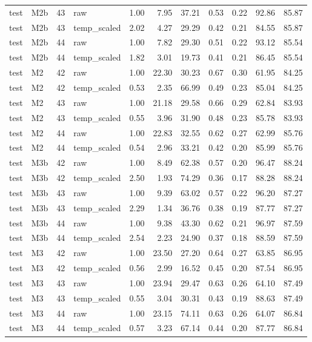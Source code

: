 \begin{tabular}{llrlrrrrrrr}
test & M2b & 43 & raw & 1.00 & 7.95 & 37.21 & 0.53 & 0.22 & 92.86 & 85.87 \\
test & M2b & 43 & temp\_scaled & 2.02 & 4.27 & 29.29 & 0.42 & 0.21 & 84.55 & 85.87 \\
test & M2b & 44 & raw & 1.00 & 7.82 & 29.30 & 0.51 & 0.22 & 93.12 & 85.54 \\
test & M2b & 44 & temp\_scaled & 1.82 & 3.01 & 19.73 & 0.41 & 0.21 & 86.45 & 85.54 \\
test & M2 & 42 & raw & 1.00 & 22.30 & 30.23 & 0.67 & 0.30 & 61.95 & 84.25 \\
test & M2 & 42 & temp\_scaled & 0.53 & 2.35 & 66.99 & 0.49 & 0.23 & 85.04 & 84.25 \\
test & M2 & 43 & raw & 1.00 & 21.18 & 29.58 & 0.66 & 0.29 & 62.84 & 83.93 \\
test & M2 & 43 & temp\_scaled & 0.55 & 3.96 & 31.90 & 0.48 & 0.23 & 85.78 & 83.93 \\
test & M2 & 44 & raw & 1.00 & 22.83 & 32.55 & 0.62 & 0.27 & 62.99 & 85.76 \\
test & M2 & 44 & temp\_scaled & 0.54 & 2.96 & 33.21 & 0.42 & 0.20 & 85.99 & 85.76 \\
test & M3b & 42 & raw & 1.00 & 8.49 & 62.38 & 0.57 & 0.20 & 96.47 & 88.24 \\
test & M3b & 42 & temp\_scaled & 2.50 & 1.93 & 74.29 & 0.36 & 0.17 & 88.28 & 88.24 \\
test & M3b & 43 & raw & 1.00 & 9.39 & 63.02 & 0.57 & 0.22 & 96.20 & 87.27 \\
test & M3b & 43 & temp\_scaled & 2.29 & 1.34 & 36.76 & 0.38 & 0.19 & 87.77 & 87.27 \\
test & M3b & 44 & raw & 1.00 & 9.38 & 43.30 & 0.62 & 0.21 & 96.97 & 87.59 \\
test & M3b & 44 & temp\_scaled & 2.54 & 2.23 & 24.90 & 0.37 & 0.18 & 88.59 & 87.59 \\
test & M3 & 42 & raw & 1.00 & 23.50 & 27.20 & 0.64 & 0.27 & 63.85 & 86.95 \\
test & M3 & 42 & temp\_scaled & 0.56 & 2.99 & 16.52 & 0.45 & 0.20 & 87.54 & 86.95 \\
test & M3 & 43 & raw & 1.00 & 23.94 & 29.47 & 0.63 & 0.26 & 64.10 & 87.49 \\
test & M3 & 43 & temp\_scaled & 0.55 & 3.04 & 30.31 & 0.43 & 0.19 & 88.63 & 87.49 \\
test & M3 & 44 & raw & 1.00 & 23.15 & 74.11 & 0.63 & 0.26 & 64.07 & 86.84 \\
test & M3 & 44 & temp\_scaled & 0.57 & 3.23 & 67.14 & 0.44 & 0.20 & 87.77 & 86.84 \\

\end{tabular}
